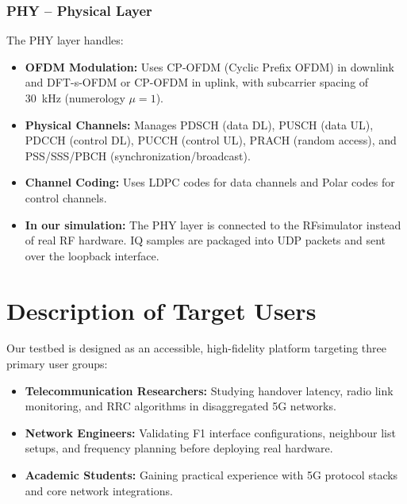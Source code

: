 \subsubsection{PHY -- Physical Layer}
The PHY layer handles:
\begin{itemize}
    \item \textbf{OFDM Modulation:} Uses CP-OFDM (Cyclic Prefix OFDM) in downlink and DFT-s-OFDM or CP-OFDM in uplink, with subcarrier spacing of 30~kHz (numerology $\mu=1$).
    \item \textbf{Physical Channels:} Manages PDSCH (data DL), PUSCH (data UL), PDCCH (control DL), PUCCH (control UL), PRACH (random access), and PSS/SSS/PBCH (synchronization/broadcast).
    \item \textbf{Channel Coding:} Uses LDPC codes for data channels and Polar codes for control channels.
    \item \textbf{In our simulation:} The PHY layer is connected to the RFsimulator instead of real RF hardware. IQ samples are packaged into UDP packets and sent over the loopback interface.
\end{itemize}


\section{Description of Target Users}
\justify
Our testbed is designed as an accessible, high-fidelity platform targeting three primary user groups:
\begin{itemize}[leftmargin=*]
    \item \textbf{Telecommunication Researchers:} Studying handover latency, radio link monitoring, and RRC algorithms in disaggregated 5G networks.
    \item \textbf{Network Engineers:} Validating F1 interface configurations, neighbour list setups, and frequency planning before deploying real hardware.
    \item \textbf{Academic Students:} Gaining practical experience with 5G protocol stacks and core network integrations.
\end{itemize}

